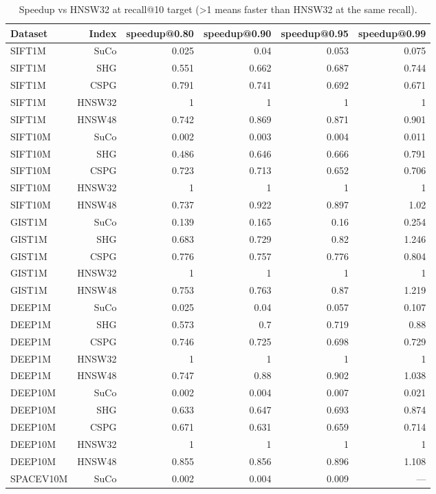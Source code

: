 \begin{table}[t]
\centering
\small
\caption{Speedup vs HNSW32 at recall@10 target (>1 means faster than HNSW32 at the same recall).}
\label{tab:speedup-k10}
\begin{tabular}{lrrrrr}
\toprule
Dataset & Index & speedup@0.80 & speedup@0.90 & speedup@0.95 & speedup@0.99 \\
\midrule
SIFT1M & SuCo & 0.025 & 0.04 & 0.053 & 0.075 \\
SIFT1M & SHG & 0.551 & 0.662 & 0.687 & 0.744 \\
SIFT1M & CSPG & 0.791 & 0.741 & 0.692 & 0.671 \\
SIFT1M & HNSW32 & 1 & 1 & 1 & 1 \\
SIFT1M & HNSW48 & 0.742 & 0.869 & 0.871 & 0.901 \\
SIFT10M & SuCo & 0.002 & 0.003 & 0.004 & 0.011 \\
SIFT10M & SHG & 0.486 & 0.646 & 0.666 & 0.791 \\
SIFT10M & CSPG & 0.723 & 0.713 & 0.652 & 0.706 \\
SIFT10M & HNSW32 & 1 & 1 & 1 & 1 \\
SIFT10M & HNSW48 & 0.737 & 0.922 & 0.897 & 1.02 \\
GIST1M & SuCo & 0.139 & 0.165 & 0.16 & 0.254 \\
GIST1M & SHG & 0.683 & 0.729 & 0.82 & 1.246 \\
GIST1M & CSPG & 0.776 & 0.757 & 0.776 & 0.804 \\
GIST1M & HNSW32 & 1 & 1 & 1 & 1 \\
GIST1M & HNSW48 & 0.753 & 0.763 & 0.87 & 1.219 \\
DEEP1M & SuCo & 0.025 & 0.04 & 0.057 & 0.107 \\
DEEP1M & SHG & 0.573 & 0.7 & 0.719 & 0.88 \\
DEEP1M & CSPG & 0.746 & 0.725 & 0.698 & 0.729 \\
DEEP1M & HNSW32 & 1 & 1 & 1 & 1 \\
DEEP1M & HNSW48 & 0.747 & 0.88 & 0.902 & 1.038 \\
DEEP10M & SuCo & 0.002 & 0.004 & 0.007 & 0.021 \\
DEEP10M & SHG & 0.633 & 0.647 & 0.693 & 0.874 \\
DEEP10M & CSPG & 0.671 & 0.631 & 0.659 & 0.714 \\
DEEP10M & HNSW32 & 1 & 1 & 1 & 1 \\
DEEP10M & HNSW48 & 0.855 & 0.856 & 0.896 & 1.108 \\
SPACEV10M & SuCo & 0.002 & 0.004 & 0.009 & — \\

\end{tabular}
\end{table}
